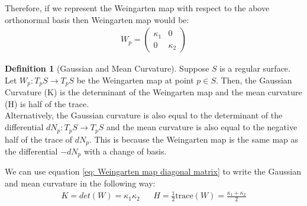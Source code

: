 \documentclass{article}
\theoremstyle{plain}
\theoremstyle{definition}
\newtheorem{definition}{Definition}
\theoremstyle{remark}
\begin{document}
Therefore, if we represent the Weingarten map with respect to the above orthonormal basis then Weingarten map would be:
\begin{align} \label{eq: Weingarten map diagonal matrix}
    W_p = \begin{pmatrix}
        \kappa_1 & 0        \\
        0        & \kappa_2
    \end{pmatrix}
\end{align}
\begin{definition}[Gaussian and Mean Curvature]
    Suppose \(S\) is a regular surface. Let \( W_p: T_pS \rightarrow T_pS \) be the Weingarten map at point \( p \in S\). Then, the Gaussian Curvature (K) is the determinant of the Weingarten map and the mean curvature (H) is half of the trace. \\
    Alternatively, the Gaussian curvature is also equal to the determinant of the differential \( dN_p: T_pS \rightarrow T_pS \) and the mean curvature is also equal to the negative half of the trace of \( dN_p\). This is because the Weingarten map is the same map as the differential \( -dN_p \) with a change of basis.
\end{definition}

We can use equation \ref{eq: Weingarten map diagonal matrix} to write the Gaussian and mean curvature in the following way:
\begin{align*}
    K = det(W) = \kappa_1\kappa_2 &  & H = \frac{1}{2} \text{trace}(W) = \frac{\kappa_1 + \kappa_2 }{2}
\end{align*}
\end{document}
